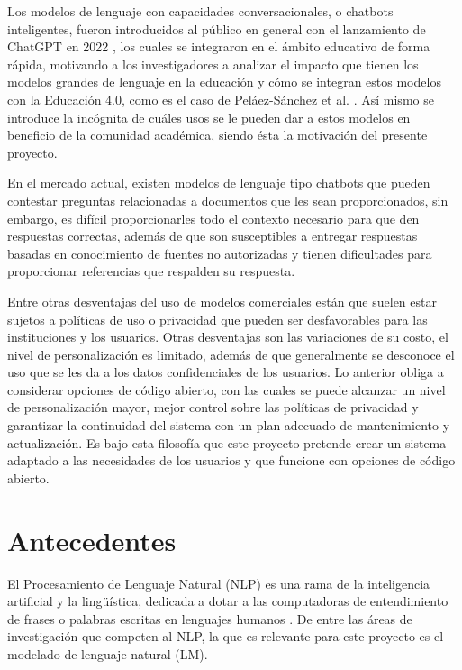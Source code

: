 Los modelos de lenguaje con capacidades conversacionales, o chatbots inteligentes,
fueron introducidos al público en general con el lanzamiento de ChatGPT en
2022 \cite{openai_introducing_2022}, los cuales se integraron en el ámbito educativo de
forma rápida, motivando a los investigadores a analizar el impacto que tienen los modelos
grandes de lenguaje en la educación y cómo se integran estos modelos con la
Educación 4.0, como es el caso de Peláez-Sánchez et al. \cite{pelaez-sanchez_impact_2024}.
Así mismo se introduce la incógnita de cuáles usos se le pueden dar a estos modelos en
beneficio de la comunidad académica, siendo ésta la motivación del presente proyecto.

En el mercado actual, existen modelos de lenguaje tipo chatbots que pueden
contestar preguntas relacionadas a documentos que les sean proporcionados,
sin embargo, es difícil proporcionarles todo el contexto necesario para que den
respuestas correctas, además de que son susceptibles a entregar respuestas basadas
en conocimiento de fuentes no autorizadas y tienen dificultades para proporcionar
referencias que respalden su respuesta.

Entre otras desventajas del uso de modelos comerciales están que suelen estar
sujetos a políticas de uso o privacidad que pueden ser desfavorables para las
instituciones y los usuarios. Otras desventajas son las variaciones de su costo,
el nivel de personalización es limitado, además de que generalmente se desconoce
el uso que se les da a los datos confidenciales de los usuarios. Lo anterior
obliga a considerar opciones de código abierto, con las cuales se puede alcanzar
un nivel de personalización mayor, mejor control sobre las políticas de privacidad
y garantizar la continuidad del sistema con un plan adecuado de mantenimiento
y actualización. Es bajo esta filosofía que este proyecto pretende crear un sistema
adaptado a las necesidades de los usuarios y que funcione con opciones de código
abierto.

\section{Antecedentes}

El Procesamiento de Lenguaje Natural (NLP) es una rama de la inteligencia artificial
y la lingüística, dedicada a dotar a las computadoras de entendimiento de frases o
palabras escritas en lenguajes humanos \cite{khurana_natural_2023}. De entre las áreas
de investigación que competen al NLP, la que es relevante para este proyecto es
el modelado de lenguaje natural (LM).

